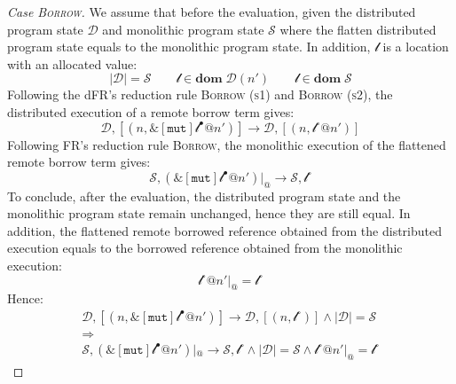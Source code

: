 \begin{proof}[Case \textsc{\emph{Borrow}}]
We assume that before the evaluation, given the distributed program state $\mathcal{D}$ and monolithic program state $\mathcal{S}$ where the flatten distributed program state equals to the monolithic program state. In addition, $\mathscr{l}$ is a location with an allocated value:
\[
|\mathcal{D}| = \mathcal{S} \quad\quad \mathscr{l} \in \textbf{dom}\; \mathcal{D}(n') \quad\quad \mathscr{l} \in \textbf{dom}\; \mathcal{S}
\]
Following the dFR's reduction rule \textsc{Borrow (s1)} and \textsc{Borrow (s2)}, the distributed execution of a remote borrow term gives:
\[
\mathcal{D}, [(n, \&[\texttt{mut}]\mathscr{l}^\bullet@n')] \longrightarrow \mathcal{D}, [(n, \mathscr{l}^\circ@n')]
\]
Following FR's reduction rule \textsc{Borrow}, the monolithic execution of the flattened remote borrow term gives:
\[
\mathcal{S}, (\&[\texttt{mut}]\mathscr{l}^\bullet@n')|_@ \longrightarrow \mathcal{S}, \mathscr{l}^\circ
\]
To conclude, after the evaluation, the distributed program state and the monolithic program state remain unchanged, hence they are still equal. In addition, the flattened remote borrowed reference obtained from the distributed execution equals to the borrowed reference obtained from the monolithic execution:
\[
\mathscr{l}^\circ@n'|_@ = \mathscr{l}^\circ
\]
Hence:
\begin{gather*}
\mathcal{D}, [(n, \&[\texttt{mut}]\mathscr{l}^\bullet@n')] \longrightarrow \mathcal{D}, [(n, \mathscr{l}^\circ)] \land |\mathcal{D}| = \mathcal{S} \\\Rightarrow\\ \mathcal{S}, (\&[\texttt{mut}]\mathscr{l}^\bullet@n')|_@ \longrightarrow \mathcal{S}, \mathscr{l}^\circ \land |\mathcal{D}| = \mathcal{S} \land \mathscr{l}^\circ@n'|_@ = \mathscr{l}^\circ
\end{gather*}
\end{proof}
